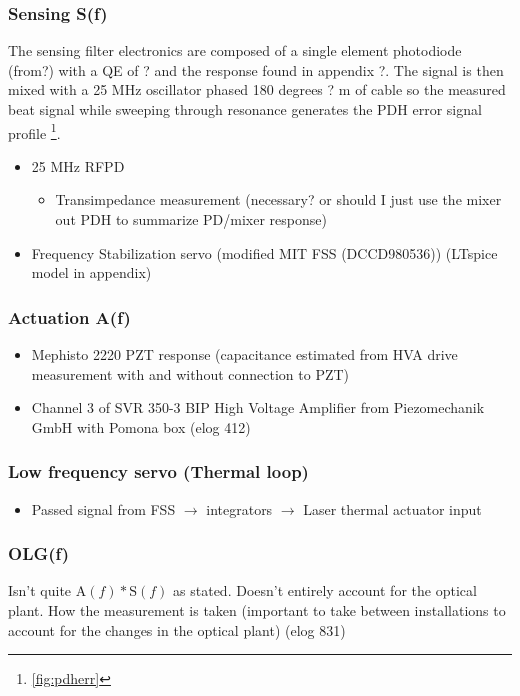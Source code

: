 \subsubsection{Sensing S(f)}
The sensing filter electronics are composed of a single element photodiode (from?) with a QE of ? and the response found in appendix ?. The signal is then mixed with a 25 MHz oscillator phased 180 degrees ? m of cable so the measured beat signal while sweeping through resonance generates the PDH error signal profile \footnote{\autoref{fig:pdherr}}.
\begin{itemize}
\item 25 MHz RFPD
\begin{itemize}
\item Transimpedance measurement (necessary? or should I just use the mixer out PDH to summarize PD/mixer response)
\end{itemize}
\item Frequency Stabilization servo (modified MIT FSS (DCCD980536)) (LTspice model in appendix)
\end{itemize}


\subsubsection{Actuation A(f)}
\begin{itemize}
\item Mephisto 2220 PZT response (capacitance estimated from HVA drive measurement with and without connection to PZT)
\item Channel 3 of SVR 350-3 BIP High Voltage Amplifier from Piezomechanik GmbH with Pomona box (elog 412)

\end{itemize}

\subsubsection{Low frequency servo (Thermal loop)}
\begin{itemize}
\item Passed signal from FSS $\rightarrow$ integrators $\rightarrow$ Laser thermal actuator input
\end{itemize}

\subsubsection{OLG(f)}
Isn't quite $\mathrm{A}(f)*\mathrm{S}(f)$ as stated. Doesn't entirely account for the optical plant.
How the measurement is taken (important to take between installations to account for the changes in the optical plant) (elog 831)

